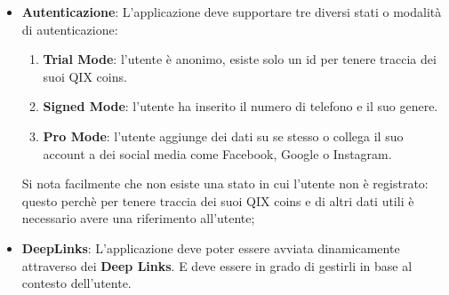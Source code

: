 \begin{itemize}
{        Tale gravità finirà con la fine dell'animazione o l'apparizione di una nuova pagina se presente.
    }
    \item {
        \textbf{Autenticazione}: L'applicazione deve supportare tre diversi stati o modalità di autenticazione:
        \begin{enumerate}
            \item\textbf{Trial Mode}: l'utente è anonimo, esiste solo un id per tenere traccia dei suoi QIX coins.
            \item\textbf{Signed Mode}: l'utente ha inserito il numero di telefono e il suo genere.
            \item \textbf{Pro Mode}: l'utente aggiunge dei dati su se stesso o collega il suo account a dei social media come Facebook, Google o Instagram.
        \end{enumerate}
        Si nota facilmente che non esiste una stato in cui l'utente non è registrato: questo perchè
        per tenere traccia dei suoi QIX coins e di altri dati utili è necessario avere una riferimento all'utente;
    }
    \item {
        \textbf{DeepLinks}: L'applicazione deve poter essere avviata dinamicamente
        attraverso dei \textbf{Deep Links}\cite{deeplinks}.
        E deve essere in grado di gestirli in base al contesto dell'utente.
    }
\end{itemize}
